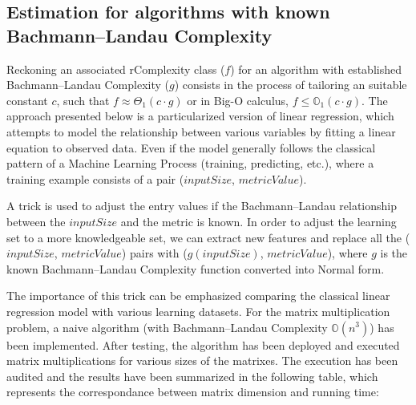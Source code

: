 \subsection{Estimation for algorithms with known Bachmann–Landau Complexity}
Reckoning an associated rComplexity class ($f$) for an algorithm with established Bachmann–Landau Complexity ($g$) consists in the process of tailoring an suitable constant $c$, such that $f \approx \Theta_{1}(c \cdot g)$ or in Big-O calculus, $f \leq  \mathbb{O}_{1} (c \cdot g)$. The approach presented below is a particularized version of linear regression, which attempts to model the relationship between various variables by fitting a linear equation to observed data. Even if the model generally follows the classical pattern of a Machine Learning Process (training, predicting, etc.), where a training example consists of a pair ($inputSize$, $metricValue$).

A trick is used to adjust the entry values if the Bachmann–Landau relationship between the $inputSize$ and the metric is known. In order to adjust the learning set to a more knowledgeable set, we can extract new features and replace all the ($inputSize$, $metricValue$) pairs with ($g(inputSize)$, $metricValue$), where $g$ is the known Bachmann–Landau Complexity function converted into Normal form.


The importance of this trick can be emphasized comparing the classical linear regression model with various learning datasets. For the matrix multiplication problem, a naive algorithm (with Bachmann–Landau Complexity $\mathbb{O}(n^{3})$) has been implemented. After testing, the algorithm has been deployed and executed matrix multiplications for various sizes of the matrixes. The execution has been audited and the results have been summarized in the following table, which represents the correspondance between matrix dimension and running time:

